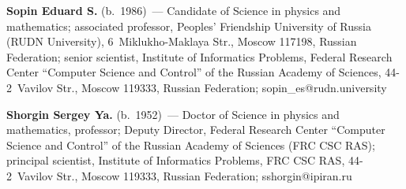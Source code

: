\vspace*{3pt}

\noindent
\textbf{Sopin Eduard S.} (b.\ 1986)~--- Candidate of Science in physics and mathematics; associated 
professor, Peoples' Friendship University of Russia (RUDN University), 6~Miklukho-Maklaya 
Str., Moscow 117198, Russian Federation; senior scientist, Institute of Informatics Problems, 
Federal Research Center ``Computer Science and Control'' of the Russian Academy of Sciences, 
44-2~Vavilov Str., Moscow 119333, Russian Federation; \mbox{sopin\_es@rudn.university} 

\vspace*{3pt}

\noindent
\textbf{Shorgin Sergey Ya.} (b.\ 1952)~--- Doctor of Science in physics and mathematics, 
professor; Deputy Director, Federal Research Center ``Computer Science and Control'' of the 
Russian Academy of Sciences (FRC CSC RAS); principal scientist, Institute of Informatics 
Problems, FRC CSC RAS, 44-2~Vavilov Str., Moscow 119333, Russian Federation; 
\mbox{sshorgin@ipiran.ru}  
\label{end\stat}


\renewcommand{\bibname}{\protect\rm Литература} 